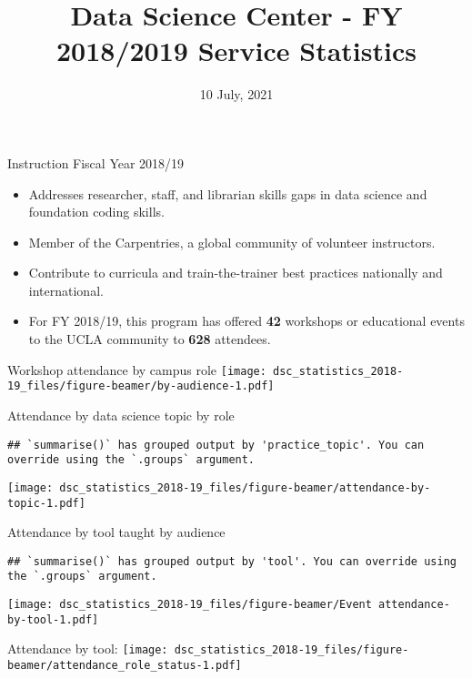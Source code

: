 \documentclass[
  ignorenonframetext,
]{beamer}
\title{Data Science Center - FY 2018/2019 Service Statistics}
\author{}
\date{\vspace{-2.5em}10 July, 2021}
\providecommand{\tightlist}{%
  \setlength{\itemsep}{0pt}\setlength{\parskip}{0pt}}
\begin{document}
\frame{\titlepage}

\begin{frame}{Instruction Fiscal Year 2018/19}
\protect\hypertarget{instruction-fiscal-year-201819}{}
\begin{itemize}
\tightlist
\item
  Addresses researcher, staff, and librarian skills gaps in data science
  and foundation coding skills.
\item
  Member of the Carpentries, a global community of volunteer
  instructors.
\item
  Contribute to curricula and train-the-trainer best practices
  nationally and international.
\item
  For FY 2018/19, this program has offered \textbf{42} workshops or
  educational events to the UCLA community to \textbf{628} attendees.
\end{itemize}
\end{frame}

\begin{frame}{Workshop attendance by campus role}
\protect\hypertarget{workshop-attendance-by-campus-role}{}
\texttt{[image: dsc\_statistics\_2018-19\_files/figure-beamer/by-audience-1.pdf]}
\end{frame}

\begin{frame}[fragile]{Attendance by data science topic by role}
\protect\hypertarget{attendance-by-data-science-topic-by-role}{}
\begin{verbatim}
## `summarise()` has grouped output by 'practice_topic'. You can override using the `.groups` argument.
\end{verbatim}

\texttt{[image: dsc\_statistics\_2018-19\_files/figure-beamer/attendance-by-topic-1.pdf]}
\end{frame}

\begin{frame}[fragile]{Attendance by tool taught by audience}
\protect\hypertarget{attendance-by-tool-taught-by-audience}{}
\begin{verbatim}
## `summarise()` has grouped output by 'tool'. You can override using the `.groups` argument.
\end{verbatim}

\texttt{[image: dsc\_statistics\_2018-19\_files/figure-beamer/Event attendance-by-tool-1.pdf]}
\end{frame}

\begin{frame}{Attendance by tool:}
\protect\hypertarget{attendance-by-tool}{}
\texttt{[image: dsc\_statistics\_2018-19\_files/figure-beamer/attendance\_role\_status-1.pdf]}
\end{frame}
\end{document}
